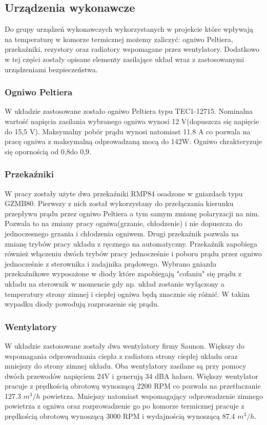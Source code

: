 \documentclass[oneside]{mgr}
\begin{document}
\subsection{Urządzenia wykonawcze}

Do grupy urządzeń wykonawczych wykorzystanych w projekcie które wpływają na temperaturę w komorze termicznej możemy zaliczyć: ogniwo Peltiera, przekaźniki, rezystory oraz radiatory wspomagane przez wentylatory. Dodatkowo w tej części zostały opisane elementy zasilające układ wraz z zastosowanymi urządzeniami bezpieczeństwa.
\subsubsection{Ogniwo Peltiera}
W układzie zastosowane zostało ogniwo Peltiera typu TEC1-12715. Nominalna wartość napięcia zasilania wybranego ogniwa wynosi 12 V(dopuszcza się napięcie do 15,5 V). Maksymalny pobór prądu wynosi natomiast 11.8 A co pozwala na pracę ogniwa z maksymalną odprowadzaną mocą do 142W. Ogniwo chrakteryzuje się opornością od 0,8\ohm do 0,9\ohm.
\subsubsection{Przekaźniki}
W pracy zostały użyte dwa przekaźniki RMP84 osadzone w gniazdach typu GZMB80. Pierwszy z nich został wykorzystany do przełączania kierunku przepływu prądu przez ogniwo Peltiera a tym samym zmianę polaryzacji na nim. Pozwala to na zmiany pracy ogniwa(grzanie, chłodzenie) i nie dopuszcza do jednoczesnego grzania i chłodzenia ogniwem. Drugi przekaźnik pozwala na zmianę trybów pracy układu z ręcznego na automatyczny. Przekaźnik zapobiega również włączeniu dwóch trybów pracy jednocześnie i poboru prądu przez ogniwo jednocześnie z sterownika i zadajnika prądowego. Wybrano gniazda przekaźnikowe wyposażone w diody które zapobiegają "cofaniu" się prądu z układu na sterownik w momencie gdy np. układ zostanie wyłączony a temperatury strony zimnej i ciepłej ogniwa będą znacznie się różnić. W takim wypadku diody powodują rozproszenie się prądu.
\subsubsection{Wentylatory}
W układzie zastosowane zostały dwa wentylatory firmy Saunon. Większy do wspomagania odprowadzania ciepła z radiatora strony ciepłej układu oraz mniejszy do strony zimnej układu. Oba wentylatory zasilane są przy pomocy dwóch przewodów napięciem 24V i generują 34 dBA hałasu. Większy wentylator pracuje z prędkością obrotową wynoszącą 2200 RPM co pozwala na przetłaczanie 127.3 $m^3/h$ powietrza. Mniejszy natomiast wspomagający odprowadzenie zimnego powietrza z ogniwa oraz rozprowadzenie go po komorze termicznej pracuje z prędkością obrotową wynoszącą 3000 RPM i wydajnością wynoszącą 87.4 $m^3/h$.
\end{document}
